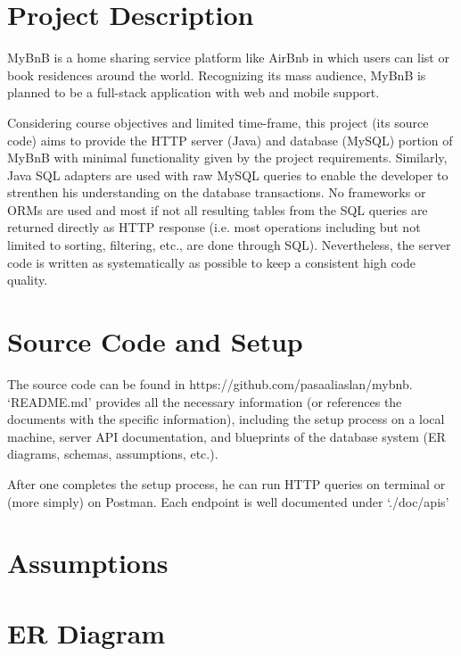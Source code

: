 \documentclass[11pt]{article}
\begin{document}
\pagestyle{fancy}
\fancyhead{}
\fancyfoot{}
\fancyfoot[R]{\thepage}

\section*{Project Description}

MyBnB is a home sharing service platform like AirBnb in which users can list or book
residences around the world. Recognizing its mass audience, MyBnB is planned to be
a full-stack application with web and mobile support.

Considering course objectives and limited time-frame, this project (its source code)
aims to provide the HTTP server (Java) and database (MySQL) portion of MyBnB with minimal functionality given by the
project requirements. Similarly, Java SQL adapters are used with raw MySQL queries
to enable the developer to strenthen his understanding on the database transactions. No frameworks or ORMs are used and
most if not all resulting tables from the SQL queries are returned directly as HTTP response (i.e.
most operations including but not limited to sorting, filtering, etc., are done through SQL).
Nevertheless, the server code is written as systematically as possible to keep a consistent high code
quality.


\section*{Source Code and Setup}

The source code can be found in https://github.com/pasaaliaslan/mybnb. `README.md' provides all the necessary
information (or references the documents with the specific information), including the setup
process on a local machine, server API documentation, and blueprints of the database system
(ER diagrams, schemas, assumptions, etc.).

After one completes the setup process, he can run HTTP queries on terminal or (more simply)
on Postman. Each endpoint is well documented under `./doc/apis'

\section*{Assumptions}

\section*{ER Diagram}
\end{document}
